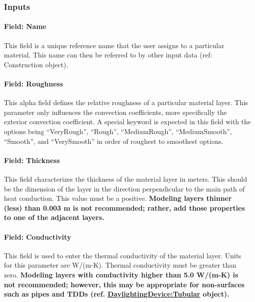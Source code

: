\subsubsection{Inputs}\label{inputs-046}

\paragraph{Field: Name}\label{field-name-045}

This field is a unique reference name that the user assigns to a particular material. This name can then be referred to by other input data (ref: Construction object).

\paragraph{Field: Roughness}\label{field-roughness-000}

This alpha field defines the relative roughness of a particular material layer. This parameter only influences the convection coefficients, more specifically the exterior convection coefficient. A special keyword is expected in this field with the options being ``VeryRough'', ``Rough'', ``MediumRough'', ``MediumSmooth'', ``Smooth'', and ``VerySmooth'' in order of roughest to smoothest options.

\paragraph{Field: Thickness}\label{field-thickness}

This field characterizes the thickness of the material layer in meters. This should be the dimension of the layer in the direction perpendicular to the main path of heat conduction. This value must be a positive. \textbf{Modeling layers thinner (less) than 0.003 m is not recommended; rather, add those properties to one of the adjacent layers.}

\paragraph{Field: Conductivity}\label{field-conductivity}

This field is used to enter the thermal conductivity of the material layer. Units for this parameter are W/(m-K). Thermal conductivity must be greater than zero. \textbf{Modeling layers with conductivity higher than 5.0 W/(m-K) is not recommended; however, this may be appropriate for non-surfaces such as pipes and TDDs (ref. \hyperref[daylightingdevicetubular]{DaylightingDevice:Tubular} object).}

